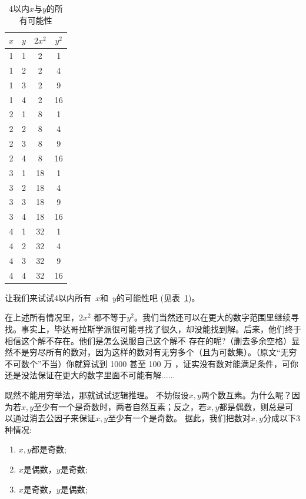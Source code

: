 \begin{table}[htbp]
\centering
\caption{4以内$x$与$y$的所有可能性}
\begin{tabular}{|c|c|c|c|}
\hline
$x$ & $y$ & $2x^2$ & $y^2$ \\
\hline
1 & 1 & 2 & 1 \\
\hline
1 & 2 & 2 & 4 \\
\hline
1 & 3 & 2 & 9 \\
\hline
1 & 4 & 2 & 16 \\
\hline
2 & 1 & 8 & 1 \\
\hline
2 & 2 & 8 & 4 \\
\hline
2 & 3 & 8 & 9 \\
\hline
2 & 4 & 8 & 16 \\
\hline
3 & 1 & 18 & 1 \\
\hline
3 & 2 & 18 & 4 \\
\hline
3 & 3 & 18 & 9 \\
\hline
3 & 4 & 18 & 16 \\
\hline
4 & 1 & 32 & 1 \\
\hline
4 & 2 & 32 & 4 \\
\hline
4 & 3 & 32 & 9 \\
\hline
4 & 4 & 32 & 16 \\
\hline
\end{tabular}
\label{tab:example}
\end{table}
让我们来试试4以内所有~$x$和~$y$的可能性吧 (见表~\ref{tab:example})。

在上述所有情况里，$2x^2$ 都不等于$y^2$。我们当然还可以在更大的数字范围里继续寻找。事实上，毕达哥拉斯学派很可能寻找了很久，却没能找到解。后来，他们终于相信这个解不存在。他们是怎么说服自己这个解不 存在的呢?{（删去多余空格）}显然不是穷尽所有的数对，因为这样的数对有{无穷多个（且为可数集）}。{（原文“无穷不可数个”不当）}你就算试到 1000 甚至 100 万 ，证实没有数对能满足条件，可你还是没法保证在更大的数字里面不可能有解......

既然不能用穷举法，那就试试逻辑推理。 
不妨假设$x,y$两个数互素。为什么呢？因为若$x,y$至少有一个是奇数时，两者自然互素；反之，若$x,y$都是偶数，则总是可以通过消去公因子来保证$x,y$至少有一个是奇数。
据此，我们把数对$x,y$分成以下3种情况: 
\begin{enumerate}
\item $x,y$都是奇数;
\item $x$是偶数，$y$是奇数;
\item $x$是奇数，$y$是偶数;
\end{enumerate}

